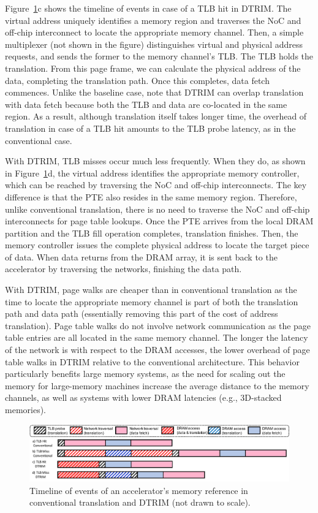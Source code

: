 Figure~\ref{fig:timeline}c shows the timeline of events
in case of a TLB hit in DTRIM. The virtual address uniquely identifies a
memory region and traverses the NoC and off-chip interconnect to
locate the appropriate memory channel. Then, a simple multiplexer (not
shown in the figure) distinguishes virtual and physical address
requests, and sends the former to the memory channel's TLB. The TLB
holds the translation. From this page frame, we can calculate the
physical address of the data, completing the translation path. Once
this completes, data fetch commences. Unlike the baseline case, note
that DTRIM can overlap translation with data fetch because
both the TLB and data are co-located in the same region. As a result, although 
translation itself takes longer time, the overhead of translation in case of a TLB hit 
amounts to the TLB probe latency, as in the conventional case.

With DTRIM, TLB misses occur much less frequently. When they do, as
shown in Figure~\ref{fig:timeline}d, the virtual address
identifies the appropriate memory controller, which can be reached by
traversing the NoC and off-chip interconnects. The key difference is that
the PTE also resides in the same memory region. Therefore, unlike conventional translation, there is no need
to traverse the NoC and off-chip interconnects for page table
lookups. Once the PTE arrives from the local DRAM partition and the
TLB fill operation completes, translation finishes. Then, the memory
controller issues the complete physical address to locate the target
piece of data. When data returns from the DRAM array, it is sent back
to the accelerator by traversing the networks, finishing the data
path.

With DTRIM, page walks are cheaper than in conventional translation
as the time to locate the appropriate memory channel is part of both
the translation path and data path (essentially removing this part of
the cost of address translation). Page table walks do not involve
network communication as the page table entries are all located in the
same memory channel. The longer the latency of the network is with
respect to the DRAM accesses, the lower overhead of page table walks
in DTRIM relative to the conventional architecture. This behavior particularly 
benefits large memory systems, as the need
for scaling out the memory for large-memory machines increase the
average distance to the memory channels, as well as systems with lower DRAM
latencies (e.g., 3D-stacked memories).


\begin{figure}
	\includegraphics[width=\textwidth]{figures/Fig345.pdf}
	\caption{Timeline of events of an accelerator's memory reference in conventional translation and DTRIM (not drawn to scale).}
	\label{fig:timeline}
\end{figure}


